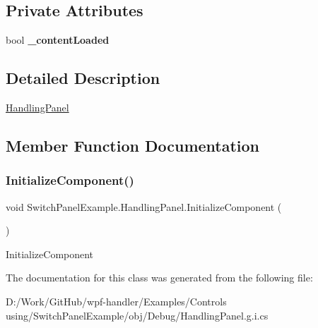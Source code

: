 \subsection*{Private Attributes}
\begin{DoxyCompactItemize}
\item 
\mbox{\label{class_switch_panel_example_1_1_handling_panel_a827b5438354a79c091552129a7c81cb1}} 
bool {\bfseries \+\_\+content\+Loaded}
\end{DoxyCompactItemize}


\subsection{Detailed Description}
\mbox{\hyperlink{class_switch_panel_example_1_1_handling_panel}{Handling\+Panel}} 



\subsection{Member Function Documentation}
\mbox{\label{class_switch_panel_example_1_1_handling_panel_a2dd562be400b810f9e0655dc4fee01d8}} 
\subsubsection{\texorpdfstring{Initialize\+Component()}{InitializeComponent()}}
{\footnotesize\ttfamily void Switch\+Panel\+Example.\+Handling\+Panel.\+Initialize\+Component (\begin{DoxyParamCaption}{ }\end{DoxyParamCaption})}



Initialize\+Component 



The documentation for this class was generated from the following file\+:\begin{DoxyCompactItemize}
\item 
D\+:/\+Work/\+Git\+Hub/wpf-\/handler/\+Examples/\+Controls using/\+Switch\+Panel\+Example/obj/\+Debug/Handling\+Panel.\+g.\+i.\+cs\end{DoxyCompactItemize}

